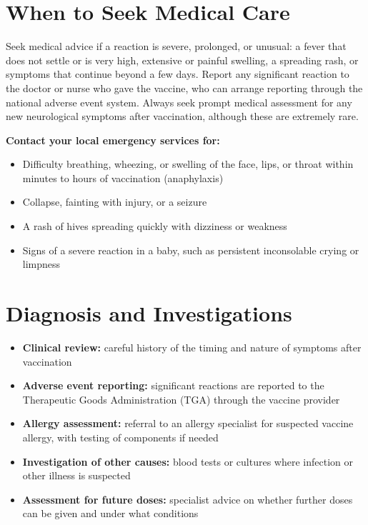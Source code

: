 \section*{When to Seek Medical Care}
Seek medical advice if a reaction is severe, prolonged, or unusual: a fever that does not settle or is very high, extensive or painful swelling, a spreading rash, or symptoms that continue beyond a few days. Report any significant reaction to the doctor or nurse who gave the vaccine, who can arrange reporting through the national adverse event system. Always seek prompt medical assessment for any new neurological symptoms after vaccination, although these are extremely rare.

\textbf{Contact your local emergency services for:}
\begin{itemize}
    \item Difficulty breathing, wheezing, or swelling of the face, lips, or throat within minutes to hours of vaccination (anaphylaxis)
    \item Collapse, fainting with injury, or a seizure
    \item A rash of hives spreading quickly with dizziness or weakness
    \item Signs of a severe reaction in a baby, such as persistent inconsolable crying or limpness
\end{itemize}

\section*{Diagnosis and Investigations}
\begin{itemize}
    \item \textbf{Clinical review:} careful history of the timing and nature of symptoms after vaccination
    \item \textbf{Adverse event reporting:} significant reactions are reported to the Therapeutic Goods Administration (TGA) through the vaccine provider
    \item \textbf{Allergy assessment:} referral to an allergy specialist for suspected vaccine allergy, with testing of components if needed
    \item \textbf{Investigation of other causes:} blood tests or cultures where infection or other illness is suspected
    \item \textbf{Assessment for future doses:} specialist advice on whether further doses can be given and under what conditions
\end{itemize}

